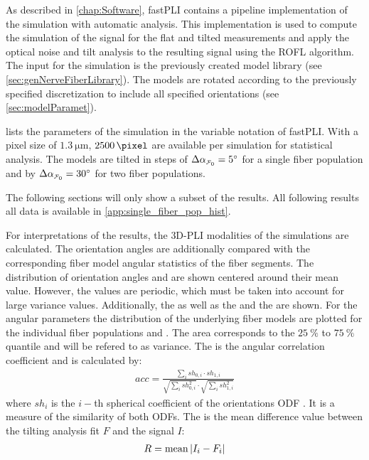 %
As described in \cref{chap:Software}, \ac{fastPLI} contains a pipeline implementation of the simulation with automatic analysis.
This implementation is used to compute the simulation of the signal for the flat and tilted measurements and apply the optical noise and tilt analysis to the resulting signal using the \ac{ROFL} algorithm. 
The input for the simulation is the previously created model library (see \cref{sec:genNerveFiberLibrary}).
The models are rotated according to the previously specified discretization to include all specified orientations (see \cref{sec:modelParamet}).
\par
% 
 lists the parameters of the simulation in the variable notation of \ac{fastPLI}.
With a pixel size of $\SI{1.3}{\micro\meter}$, $\SI{2500}{\pixel}$ are available per simulation for statistical analysis.
The models are tilted in steps of $\Delta \modelInc = \SI{5}{\degree}$ for a single fiber population and by $\Delta \modelInc = \SI{30}{\degree}$ for two fiber populations.
\par
% 
The following sections will only show a subset of the results. 
All following results all data is available in \cref{app:single_fiber_pop_hist}.
\par
% 
For interpretations of the results, the \ac{3D-PLI} modalities of the simulations are calculated.
The orientation angles are additionally compared with the corresponding fiber model angular statistics of the fiber segments.
The distribution of orientation angles \dir{} and \inc{} are shown centered around their mean value.
However, the values are periodic, which must be taken into account for \eg{} large variance values.
Additionally, the \openingAngle{} as well as the \accvalue{} and the \rvalue{} are shown.
For the angular parameters the distribution of the underlying fiber models are plotted for the individual fiber populations \popa{} and \popb{}.
The area corresponds to the $\SI{25}{\percent}$ to $\SI{75}{\percent}$ quantile and will be refered to as \bvariance{} variance.
The \accvalue{} is the angular correlation coefficient and is calculated by:
\begin{align}
    acc = \frac{\sum_i{\mathit{sh}_{0,i} \cdot \mathit{sh}_{1,i}}}{\sqrt{\sum_i{\mathit{sh}_{0,i}^2}} \cdot \sqrt{\sum_i{\mathit{sh}_{1,i}^2}}}
\end{align}
where $\mathit{sh}_i$ is the $i-$th spherical coefficient of the orientations \ac{ODF} \cite{Schilling2018}.
It is a measure of the similarity of both \acp{ODF}.
The \rvalue{} is the mean difference value between the tilting analysis fit $F$ and the signal $I$:
\begin{align}
    R = \operatorname{mean}{|I_i-F_i|}
\end{align}
\par
% 
% 
% 
